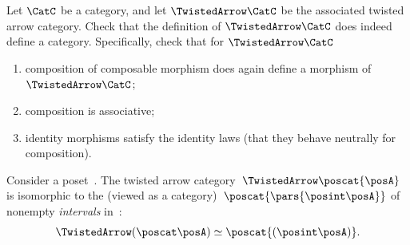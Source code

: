 \begin{gradedexercise}
    \label{ex:TwistedCat}

    Let $\CatC$ be a category, and let $\TwistedArrow\CatC$ be the associated twisted arrow category.
    Check that the definition of $\TwistedArrow\CatC$ does indeed define a category.
    Specifically, check that for $\TwistedArrow\CatC$
    \begin{enumerate}
        \item composition of composable morphism does again define a morphism of $\TwistedArrow\CatC$;
        \item composition is associative;
        \item identity morphisms satisfy the identity laws (that they behave neutrally for composition).
    \end{enumerate}
\end{gradedexercise}


\begin{example}
    \label{exa:twisted-arrow-poset}
    Consider a poset~\posA.
    The twisted arrow category~$\TwistedArrow \poscat{\posA}$ is isomorphic to the  (viewed as a category)~$\poscat{\pars{\posint\posA}}$ of nonempty \emph{intervals} in~\posA:
    \begin{equation}
        \TwistedArrow (\poscat \posA) \simeq \poscat{(\posint\posA)}.
    \end{equation}
\end{example}

